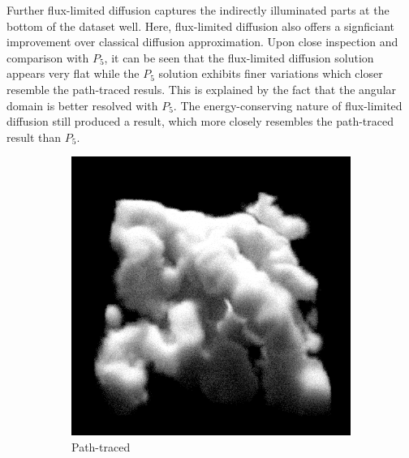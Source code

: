 Further flux-limited diffusion captures the indirectly illuminated parts at the bottom of the dataset well. Here, flux-limited diffusion also offers a signficiant improvement over classical diffusion approximation. Upon close inspection and comparison with $P_5$, it can be seen that the flux-limited diffusion solution appears very flat while the $P_5$ solution exhibits finer variations which closer resemble the path-traced resuls. This is explained by the fact that the angular domain is better resolved with $P_5$. The energy-conserving nature of flux-limited diffusion still produced a result, which more closely resembles the path-traced result than $P_5$.

\begin{figure}[h]
\centering
\begin{subfigure}[t]{0.48\columnwidth}
\includegraphics[width=\columnwidth]{06_fld/results/nebulae_ms_groundtruth.png}
\caption{Path-traced}
\label{fig:fld_results_nebulae_1}
\end{subfigure}
\hspace{0.01\columnwidth}
\begin{subfigure}[t]{0.48\columnwidth}

\end{subfigure}
\end{figure}
